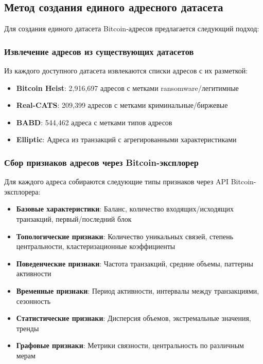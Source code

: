 \subsection{Метод создания единого адресного датасета}

Для создания единого датасета Bitcoin-адресов предлагается следующий подход:

\subsubsection{Извлечение адресов из существующих датасетов}

Из каждого доступного датасета извлекаются списки адресов с их разметкой:

\begin{itemize}
    \item \textbf{Bitcoin Heist}: 2,916,697 адресов с метками ransomware/легитимные
    \item \textbf{Real-CATS}: 209,399 адресов с метками криминальные/биржевые
    \item \textbf{BABD}: 544,462 адреса с метками типов адресов
    \item \textbf{Elliptic}: Адреса из транзакций с агрегированными характеристиками
\end{itemize}

\subsubsection{Сбор признаков адресов через Bitcoin-эксплорер}

Для каждого адреса собираются следующие типы признаков через API Bitcoin-эксплорера:

\begin{itemize}
    \item \textbf{Базовые характеристики}: Баланс, количество входящих/исходящих транзакций, первый/последний блок
    \item \textbf{Топологические признаки}: Количество уникальных связей, степень центральности, кластеризационные коэффициенты
    \item \textbf{Поведенческие признаки}: Частота транзакций, средние объемы, паттерны активности
    \item \textbf{Временные признаки}: Период активности, интервалы между транзакциями, сезонность
    \item \textbf{Статистические признаки}: Дисперсия объемов, экстремальные значения, тренды
    \item \textbf{Графовые признаки}: Метрики связности, центральность по различным мерам
\end{itemize}

